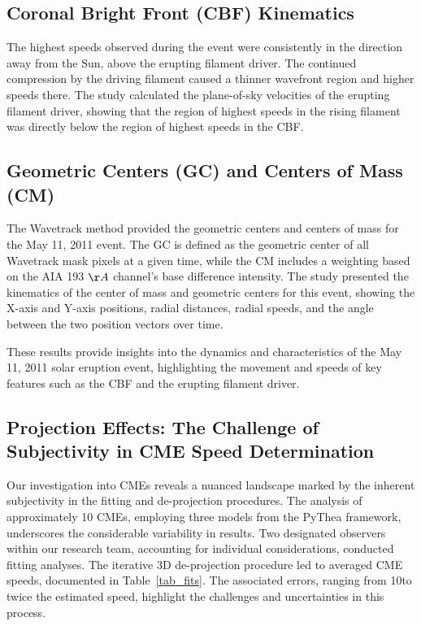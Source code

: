 \subsection{Coronal Bright Front (CBF) Kinematics}
The highest speeds observed during the event were consistently in the direction away from the Sun, above the erupting filament driver. The continued compression by the driving filament caused a thinner wavefront region and higher speeds there. The study calculated the plane-of-sky velocities of the erupting filament driver, showing that the region of highest speeds in the rising filament was directly below the region of highest speeds in the CBF.

\subsection{Geometric Centers (GC) and Centers of Mass (CM)}
The Wavetrack method provided the geometric centers and centers of mass for the May 11, 2011 event. The GC is defined as the geometric center of all Wavetrack mask pixels at a given time, while the CM includes a weighting based on the AIA 193 $\AA$ channel's base difference intensity. The study presented the kinematics of the center of mass and geometric centers for this event, showing the X-axis and Y-axis positions, radial distances, radial speeds, and the angle between the two position vectors over time.

These results provide insights into the dynamics and characteristics of the May 11, 2011 solar eruption event, highlighting the movement and speeds of key features such as the CBF and the erupting filament driver.

\subsection{Projection Effects: The Challenge of Subjectivity in CME Speed Determination}
Our investigation into CMEs reveals a nuanced landscape marked by the inherent subjectivity in the fitting and de-projection procedures. The analysis of approximately 10 CMEs, employing three models from the PyThea framework, underscores the considerable variability in results. Two designated observers within our research team, accounting for individual considerations, conducted fitting analyses. The iterative 3D de-projection procedure led to averaged CME speeds, documented in Table~\ref{tab_fits}. The associated errors, ranging from 10\kms to twice the estimated speed, highlight the challenges and uncertainties in this process.

